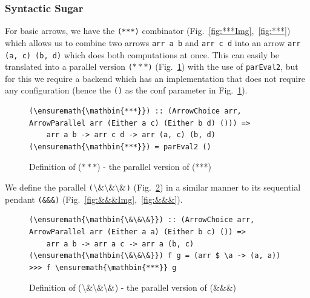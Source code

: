\documentclass{jfp1}
\newcommand{\inlinecode}[1]{\texttt{#1}}
\begin{document}
	\subsubsection{Syntactic Sugar} \label{syntacticSugar}
For basic arrows, we have the \inlinecode{(***)} combinator (Fig.~\ref{fig:***Img},~\ref{fig:***}) which allows us to combine two arrows \inlinecode{arr a b} and \inlinecode{arr c d} into an arrow \inlinecode{arr (a, c) (b, d)} which does both computations at once. This can easily be translated into a parallel version \inlinecode{(\ensuremath{\mathbin{***}})} (Fig.~\ref{fig:par***}) with the use of \inlinecode{parEval2}, but for this we require a backend which has an implementation that does not require any configuration (hence the \inlinecode{()} as the conf parameter in Fig.~\ref{fig:par***}).
\begin{figure}[h]
\begin{lstlisting}[frame=htrbl]
(\ensuremath{\mathbin{***}}) :: (ArrowChoice arr, ArrowParallel arr (Either a c) (Either b d) ())) =>
	arr a b -> arr c d -> arr (a, c) (b, d)
(\ensuremath{\mathbin{***}}) = parEval2 ()
\end{lstlisting}
\caption{Definition of (\ensuremath{\mathbin{***}}) - the parallel version of (***)}
\label{fig:par***}
\end{figure}
We define the parallel \inlinecode{(\ensuremath{\mathbin{\char92 \&\char92 \&\char92 \&}})} (Fig.~\ref{fig:par&&&}) in a similar manner to its sequential pendant \inlinecode{(\&\&\&)} (Fig.~\ref{fig:&&&Img},~\ref{fig:&&&}).
\begin{figure}[h]
\begin{lstlisting}[frame=htrbl]
(\ensuremath{\mathbin{\&\&\&}}) :: (ArrowChoice arr, ArrowParallel arr (Either a a) (Either b c) ()) =>
	arr a b -> arr a c -> arr a (b, c)
(\ensuremath{\mathbin{\&\&\&}}) f g = (arr $ \a -> (a, a)) >>> f \ensuremath{\mathbin{***}} g
\end{lstlisting} %
\caption{Definition of (\ensuremath{\mathbin{\char92 \&\char92 \&\char92 \&}}) - the parallel version of (\&\&\&)}
\label{fig:par&&&}
\end{figure}
\end{document}

